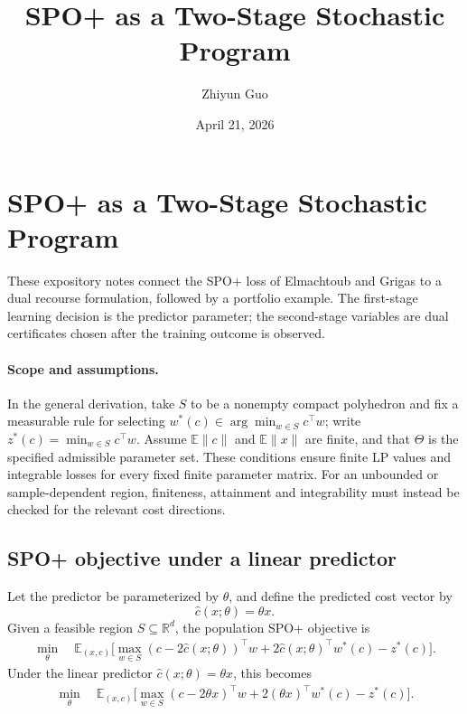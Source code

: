 \documentclass[11pt]{article}
\title{\textbf{SPO+ as a Two-Stage Stochastic Program}}
\author{Zhiyun Guo}
\date{April 21, 2026}
\theoremstyle{definition}
\begin{document}
\maketitle

\section{SPO+ as a Two-Stage Stochastic Program}

These expository notes connect the SPO+ loss of Elmachtoub and Grigas to a dual recourse formulation, followed by a portfolio example. The first-stage learning decision is the predictor parameter; the second-stage variables are dual certificates chosen after the training outcome is observed.

\paragraph{Scope and assumptions.}
In the general derivation, take $S$ to be a nonempty compact polyhedron and fix a measurable rule for selecting $w^*(c)\in\arg\min_{w\in S}c^\top w$; write $z^*(c)=\min_{w\in S}c^\top w$. Assume $\mathbb E\|c\|$ and $\mathbb E\|x\|$ are finite, and that $\Theta$ is the specified admissible parameter set. These conditions ensure finite LP values and integrable losses for every fixed finite parameter matrix. For an unbounded or sample-dependent region, finiteness, attainment and integrability must instead be checked for the relevant cost directions.

\subsection{SPO+ objective under a linear predictor}

Let the predictor be parameterized by $\theta$, and define the predicted cost vector by
\[
\hat c(x;\theta)=\theta x.
\]
Given a feasible region $S \subseteq \mathbb{R}^d$, the population SPO+ objective is
\begin{align}
\min_{\theta} \quad 
\mathbb{E}_{(x,c)}\Big[
\max_{w\in S} (c-2\hat c(x;\theta))^\top w
+2\hat c(x;\theta)^\top w^*(c)
-z^*(c)
\Big].
\label{eq:spo-pop}
\end{align}
Under the linear predictor $\hat c(x;\theta)=\theta x$, this becomes
\begin{align}
\min_{\theta} \quad 
\mathbb{E}_{(x,c)}\Big[
\max_{w\in S} (c-2\theta x)^\top w
+2(\theta x)^\top w^*(c)
-z^*(c)
\Big].
\label{eq:spo-linear}
\end{align}
\end{document}
